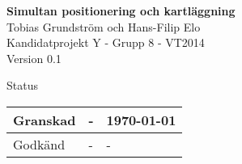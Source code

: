 \documentclass[a4paper,12pt,fleqn]{article}
\begin{document}
	\pagestyle{fancy}
	\vspace*{\fill}
		\begingroup
			\begin{center}
				\huge{\textbf{Simultan positionering och kartläggning}}
				\\
				\vspace{10pt}
				\normalsize
				Tobias Grundström och Hans-Filip Elo
				\\
				Kandidatprojekt Y - Grupp 8 - VT2014
				\\
				Version 0.1
				\end{center}
		\endgroup
	\vspace*{\fill}

	\begin{center} %
		Status
		\\
		\vspace{3pt} %
	    \begin{tabular}{| p{3cm} | p{3cm} | p{3cm} |} %
	    \hline %
	    Granskad & - & \today \\ \hline %
		Godkänd & - & - \\ \hline %

	    \end{tabular}
	\end{center}
	\vspace{2cm}
	\newpage
\end{document}
